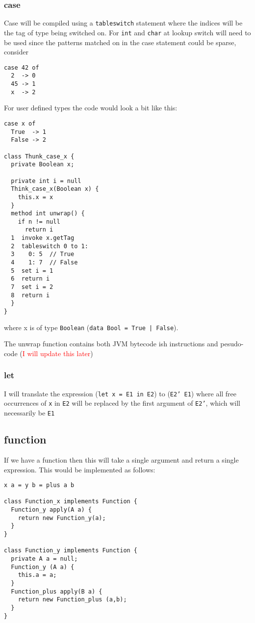 \documentclass[12pt,a4paper,twoside]{article}
\begin{document}
\subsubsection{case}

Case will be compiled using a \texttt{tableswitch} statement where the indices will be the tag of type being switched on. For \texttt{int} and \texttt{char} at lookup 
switch will need to be used since the patterns matched on in the case statement could be sparse, consider

\begin{verbatim}
case 42 of
  2  -> 0
  45 -> 1
  x  -> 2
\end{verbatim}

For user defined types the code would look a bit like this:

\begin{verbatim}
case x of
  True  -> 1
  False -> 2

class Thunk_case_x {
  private Boolean x;

  private int i = null
  Think_case_x(Boolean x) {
    this.x = x
  }
  method int unwrap() {
    if n != null
      return i
  1  invoke x.getTag
  2  tableswitch 0 to 1:
  3    0: 5  // True
  4    1: 7  // False
  5  set i = 1
  6  return i
  7  set i = 2
  8  return i
  }
}
\end{verbatim}

where x is of type \texttt{Boolean} (\texttt{data Bool = True | False}).

The unwrap function contains both JVM bytecode ish instructions and pesudo-code (\textcolor{red}{I will update this later})

\subsubsection{let} 

I will translate the expression (\texttt{let x = E1 in E2}) to (\texttt{E2' E1}) where all free occurrences of \texttt{x} in \texttt{E2} will be replaced 
by the first argument of \texttt{E2'}, which will necessarily be \texttt{E1}

\subsection{function}

If we have a function then this will take a single argument and return a single expression. This would be implemented as follows:

\begin{verbatim}
x a = y b = plus a b

class Function_x implements Function {
  Function_y apply(A a) {
    return new Function_y(a);
  }
}

class Function_y implements Function {
  private A a = null;
  Function_y (A a) {
    this.a = a;
  }
  Function_plus apply(B a) {
    return new Function_plus (a,b);
  }
}
\end{verbatim}
\end{document}
